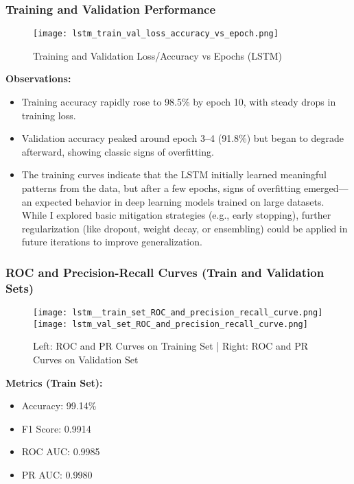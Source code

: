 \documentclass[12pt]{article}
\begin{document}
\subsubsection*{Training and Validation Performance}

\begin{figure}[H]
    \centering
    \texttt{[image: lstm\_train\_val\_loss\_accuracy\_vs\_epoch.png]}
    \caption{Training and Validation Loss/Accuracy vs Epochs (LSTM)}
\end{figure}

\textbf{Observations:}
\begin{itemize}
    \item Training accuracy rapidly rose to 98.5\% by epoch 10, with steady drops in training loss.
    \item Validation accuracy peaked around epoch 3–4 (91.8\%) but began to degrade afterward, showing classic signs of overfitting.
    \item The training curves indicate that the LSTM initially learned meaningful patterns from the data, but after a few epochs, signs of overfitting emerged—an expected behavior in deep learning models trained on large datasets. While I explored basic mitigation strategies (e.g., early stopping), further regularization (like dropout, weight decay, or ensembling) could be applied in future iterations to improve generalization.
\end{itemize}

\subsubsection*{ROC and Precision-Recall Curves (Train and Validation Sets)}

\begin{figure}[H]
    \centering
    \texttt{[image: lstm\_\_train\_set\_ROC\_and\_precision\_recall\_curve.png]}
    \texttt{[image: lstm\_val\_set\_ROC\_and\_precision\_recall\_curve.png]}
    \caption{Left: ROC and PR Curves on Training Set | Right: ROC and PR Curves on Validation Set}
\end{figure}

\textbf{Metrics (Train Set):}
\begin{itemize}
    \item Accuracy: 99.14\%
    \item F1 Score: 0.9914
    \item ROC AUC: 0.9985
    \item PR AUC: 0.9980
\end{itemize}
\end{document}
